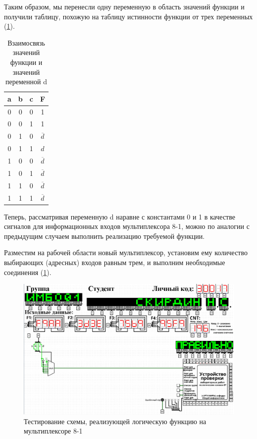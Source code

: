 \documentclass[14pt, a4paper]{extreport}
\begin{document}
Таким образом, мы перенесли одну переменную в область значений функции и получили таблицу, похожую на таблицу истинности функции от трех переменных (\cref{tab:f-and-d-relation}).

\begin{table}[!htbp]
	\caption{Взаимосвязь значений функции и значений переменной d}
	\label{tab:f-and-d-relation}
	\begin{tabular}{|c|c|c|c|}
		\hline
		a & b & c & F \\
		\hline
		0 & 0 & 0 & 1 \\
		\hline
		0 & 0 & 1 & 1 \\
		\hline
		0 & 1 & 0 & $\overline{d}$ \\
		\hline
		0 & 1 & 1 & $d$ \\
		\hline
		1 & 0 & 0 & $\overline{d}$ \\
		\hline
		1 & 0 & 1 & $\overline{d}$ \\
		\hline
		1 & 1 & 0 & $\overline{d}$ \\
		\hline
		1 & 1 & 1 & $\overline{d}$ \\
		\hline
	\end{tabular}
\end{table}

Теперь, рассматривая переменную d наравне с константами 0 и 1 в качестве сигналов для информационных входов мультиплексора 8-1, можно по аналогии с предыдущим случаем выполнить реализацию требуемой функции.

Разместим на рабочей области новый мультиплексор, установим ему количество выбирающих (адресных) входов равным трем, и выполним необходимые соединения (\cref{fig:multiplexer-8-1}).

\begin{figure}[H]
	\caption{Тестирование схемы, реализующей логическую функцию на мультиплексоре 8-1}
	\label{fig:multiplexer-8-1}
	\includegraphics[width=\textwidth]{multiplexer-8-1}
\end{figure}
\end{document}
